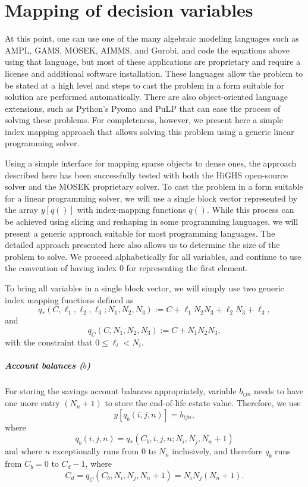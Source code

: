 \documentclass{report}[fleqn,12pt]
\begin{document}
\chapter{Mapping of decision variables}
At this point, one can use one of the many algebraic modeling languages
such as AMPL, GAMS, MOSEK, AIMMS, and Gurobi, and code the equations above
using that language, but most of these applications are
proprietary and require a license and additional software installation.
These languages allow the problem to be stated at a high level and
steps to cast the problem in a form suitable for solution are performed automatically.
There are also object-oriented language extensions, such as Python's Pyomo
and PuLP that can ease the process of solving these problems.
For completeness, however, we present here a simple
index mapping approach that allows solving this problem using a generic
linear programming solver.

Using a simple interface for mapping sparse objects to dense ones, the approach described here
has been successfully tested with both the HiGHS open-source solver
and the MOSEK proprietary solver.
To cast the problem in a form suitable for a linear programming solver, we will use
a single block vector represented by the array $y[q()]$ with index-mapping functions $q()$.
While this process can be achieved using slicing and reshaping in some programming
languages, we will present a generic approach suitable for most programming languages.
The detailed approach presented here also allows us to determine the size of the problem to solve.
We proceed alphabetically for all variables, and continue to use the convention of having
index 0 for representing the first element.

To bring all variables in a single block vector,
we will simply use two generic index mapping functions defined as
\begin{equation}
	q_*(C, \ell_1, \ell_2, \ell_3 ; N_1, N_2, N_3) :=
	C + \ell_1N_2N_3 + \ell_2N_3 + \ell_3 ,
\end{equation}
and
\begin{equation}
	q_C(C, N_1, N_2, N_3) :=
	C + N_1N_2N_3,
\end{equation}
with the constraint that $0 \le \ell_i < N_i$.

\paragraph*{Account balances (\boldmath$b$)}
For storing the savings account balances appropriately, variable $b_{ijn}$ needs to have one
more entry $(N_n + 1)$ to
store the end-of-life estate value. Therefore, we use
\begin{equation}
	y[q_b(i, j, n)] = b_{ijn},
\end{equation}
where
\begin{equation}
	\label{Eq:Extra}
	q_b(i, j, n) = q_*(C_b, i, j, n; N_i, N_j, N_n+1)
\end{equation}
and where $n$ exceptionally runs from 0 to $N_n$ inclusively, and therefore
$q_b$ runs from $C_b = 0$ to $C_{d} - 1$,
where
\[
	C_{d} = q_C(C_b, N_i, N_j, N_n+1) = N_i N_j (N_n+1).
\]
\end{document}
